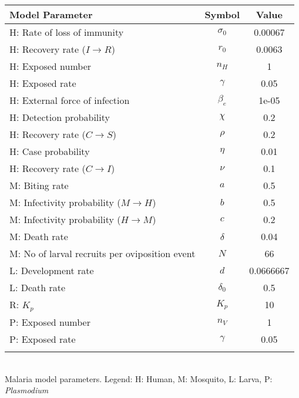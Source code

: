 \begin{table}
\noindent
\begin{tabular}{lcc}
{\bf Model Parameter} & {\bf Symbol} & {\bf Value}\\
\hline\hline
  H: Rate of loss of immunity & $\sigma_0$ & 0.00067\\
  H: Recovery rate ($I \rightarrow R$) & $r_0$ & 0.0063\\
  H: Exposed number & $n_H$ & 1\\
  H: Exposed rate & $\gamma$ & 0.05\\
  H: External force of infection & $\beta_e$ & 1e-05\\
  H: Detection probability & $\chi$ & 0.2\\
  H: Recovery rate ($C \rightarrow S$) & $\rho$ & 0.2\\
  H: Case probability & $\eta$ & 0.01\\
  H: Recovery rate ($C \rightarrow I$) & $\nu$ & 0.1\\
  M: Biting rate & $a$ & 0.5\\
  M: Infectivity probability ($M \rightarrow H$) & $b$ & 0.5\\
  M: Infectivity probability ($H \rightarrow M$) & $c$ & 0.2\\
  M: Death rate & $\delta$ & 0.04\\
  M: No of larval recruits per oviposition event & $N$ & 66\\
  L: Development rate & $d$ & 0.0666667\\
  L: Death rate & $\delta_0$ & 0.5\\
  R: $K_p$ & $K_p$ & 10\\
  P: Exposed number & $n_V$ & 1\\
  P: Exposed rate & $\gamma$ & 0.05\\
\hline\hline
\smallskip
\end{tabular}\\
 Malaria model parameters. Legend: {\small H: Human, M: Mosquito, L: Larva, P: {\em Plasmodium}}
\end{table}
